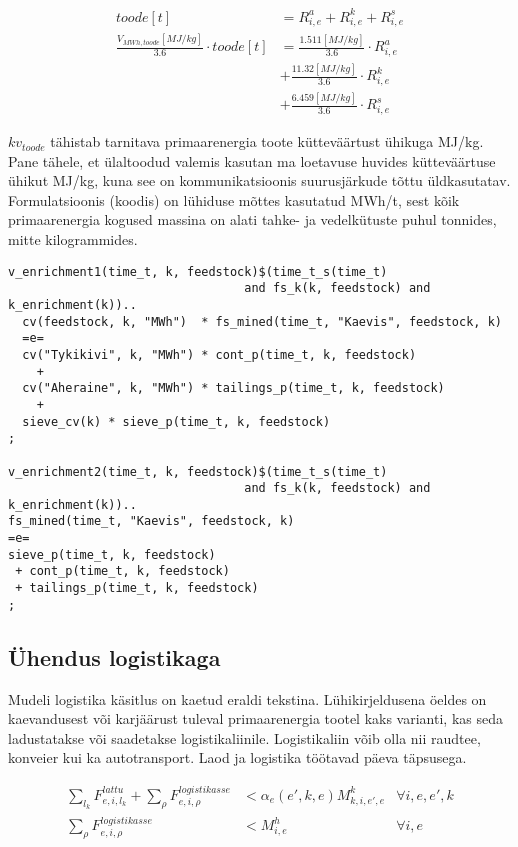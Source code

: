 \documentclass[10pt,a4paper]{article}
\begin{document}
\begin{align}
toode [t] & = R^a_{i,e} + R^k_{i,e} + R^s_{i,e} \nonumber \\
\frac{\mathit{V}_{MWh, toode} [MJ/kg]}{3.6} \cdot toode [t] & = \frac{1.511 [MJ/kg]}{3.6}\cdot R^a_{i,e}  \nonumber \\
&+ \frac{11.32 [MJ/kg]}{3.6} \cdot R^k_{i,e} \nonumber \\ 
&+ \frac{6.459 [MJ/kg]}{3.6} \cdot R^s_{i,e}
\end{align}

$kv_{toode}$ tähistab tarnitava primaarenergia toote kütteväärtust ühikuga MJ/kg. Pane tähele, et ülaltoodud valemis kasutan ma loetavuse huvides kütteväärtuse ühikut MJ/kg, kuna see on kommunikatsioonis suurusjärkude tõttu üldkasutatav. Formulatsioonis (koodis) on lühiduse mõttes kasutatud MWh/t, sest kõik primaarenergia kogused massina on alati tahke- ja vedelkütuste puhul tonnides, mitte kilogrammides.

\begin{verbatim}
v_enrichment1(time_t, k, feedstock)$(time_t_s(time_t)
                                 and fs_k(k, feedstock) and k_enrichment(k))..
  cv(feedstock, k, "MWh")  * fs_mined(time_t, "Kaevis", feedstock, k)
  =e=
  cv("Tykikivi", k, "MWh") * cont_p(time_t, k, feedstock)
    +
  cv("Aheraine", k, "MWh") * tailings_p(time_t, k, feedstock)
    +
  sieve_cv(k) * sieve_p(time_t, k, feedstock)
;

v_enrichment2(time_t, k, feedstock)$(time_t_s(time_t)
                                 and fs_k(k, feedstock) and k_enrichment(k))..
fs_mined(time_t, "Kaevis", feedstock, k)
=e=
sieve_p(time_t, k, feedstock)
 + cont_p(time_t, k, feedstock)
 + tailings_p(time_t, k, feedstock)
;
\end{verbatim}

\subsection{Ühendus logistikaga}
Mudeli logistika käsitlus on kaetud eraldi tekstina. Lühikirjeldusena öeldes on kaevandusest või karjäärust tuleval primaarenergia tootel kaks varianti, kas seda ladustatakse või saadetakse logistikaliinile. Logistikaliin võib olla nii raudtee, konveier kui ka autotransport. Laod ja logistika töötavad päeva täpsusega.

\begin{align}
\sum_{l_k} F^{lattu}_{e,i,l_k} + \sum_{\rho} F^{logistikasse}_{e,i,\rho} &< \mathit{\alpha}_e(e', k, e) M^k_{k,i,e', e} & \forall i,e,e',k \\
\sum_{\rho} F^{logistikasse}_{e,i,\rho} &< M^h_{i,e} & \forall i,e 
\end{align}
\end{document}
